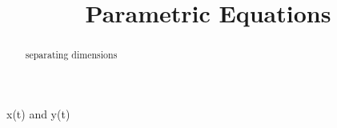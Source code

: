 \documentclass{ximera}
\title{Parametric Equations}
\begin{document}
\begin{abstract}
separating dimensions
\end{abstract}
\maketitle



x(t) and y(t)
\end{document}
